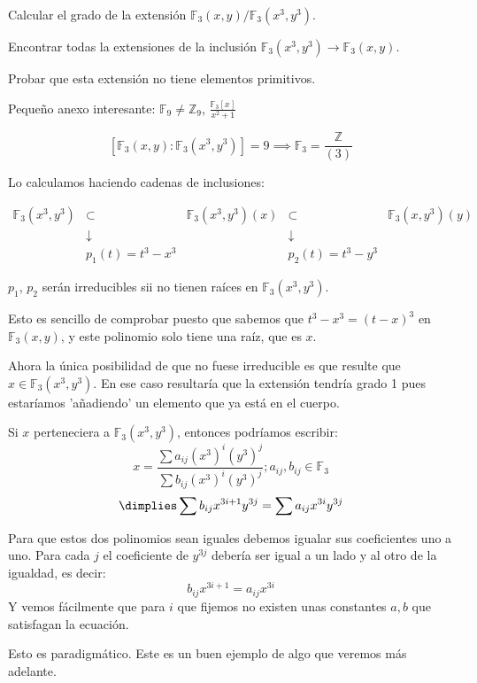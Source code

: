 \begin{problem}[3]

\ppart Calcular el grado de la extensión $\mathbb{F}_3(x, y)/\mathbb{F}_3(x^3, y^3)$.

\ppart Encontrar todas la extensiones de la inclusión $\mathbb{F}_3 (x^3 , y^3) → \mathbb{F}_3(x, y)$.

\ppart Probar que esta extensión no tiene elementos primitivos.

\solution

Pequeño anexo interesante: $\mathbb{F}_9 ≠ ℤ_9$, $\frac{\mathbb{F}_3[x]}{x^2+1}$



\spart
$$[\mathbb{F}_3(x,y) : \mathbb{F}_3(x^3,y^3)] = 9 \implies \mathbb{F}_3 = \frac{ℤ}{(3)}$$


Lo calculamos haciendo cadenas de inclusiones:

$$\begin{array}{ccccc}\mathbb{F}_3(x^3,y^3) &\subset& \mathbb{F}_3(x^3,y^3)(x) &\subset& \mathbb{F}_3(x,y^3)(y)\\
&\downarrow& & \downarrow&\\
&p_1(t) = t^3-x^3& & p_2(t) = t^3-y^3&\end{array}$$

$p_1$, $p_2$ serán irreducibles sii no tienen raíces en $\mathbb{F}_3(x^3,y^3)$.

Esto es sencillo de comprobar puesto que sabemos que $t^3-x^3 = (t-x)^3$ en $\mathbb{F}_3(x,y)$, y este polinomio solo tiene una raíz, que es $x$.

Ahora la única posibilidad de que no fuese irreducible es que resulte que $x\in \mathbb{F}_3(x^3,y^3)$. En ese caso resultaría que la extensión tendría grado 1 pues estaríamos 'añadiendo' un elemento que ya está en el cuerpo.

Si $x$ perteneciera a $\mathbb{F}_3(x^3,y^3)$, entonces podríamos escribir:
\[x = \frac{\sum a_{ij}(x^3)^i(y^3)^j}{\sum b_{ij}(x^3)^i(y^3)^j}; a_{ij},b_{ij} ∈ \mathbb{F}_3\]
\[\dimplies \sum b_{ij} x^{3i+1}y^{3j} = \sum a_{ij} x^{3i}y^{3j}\]

Para que estos dos polinomios sean iguales debemos igualar sus coeficientes uno a uno. Para cada $j$ el coeficiente de $y^{3j}$ debería ser igual a un lado y al otro de la igualdad, es decir:
\[b_{ij}x^{3i+1}=a_{ij}x^{3i}\]
Y vemos fácilmente que para $i$ que fijemos no existen unas constantes $a,b$ que satisfagan la ecuación.

\spart Esto es paradigmático. Este es un buen ejemplo de algo que veremos más adelante.


\end{problem}
